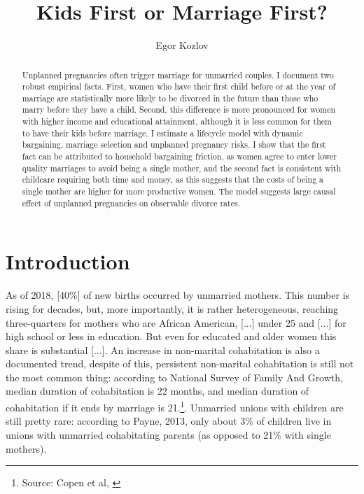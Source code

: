 \documentclass[12pt,letter]{article}
\title{Kids First or Marriage First?}
\author{Egor Kozlov}
\begin{document}
\maketitle



\begin{abstract}
Unplanned pregnancies often trigger marriage for unmarried couples. I document two robust empirical facts. First, women who have their first child before or at the year of marriage are statistically more likely to be divorced in the future than those who marry before they have a child. Second, this difference is more pronounced for women with higher income and educational attainment, although it is less common for them to have their kids before marriage. I estimate a lifecycle model with dynamic bargaining, marriage selection and unplanned pregnancy risks. I show that the first fact can be attributed to household bargaining friction, as women agree to enter lower quality marriages to avoid being a single mother, and  the second fact is consistent with childcare requiring both time and money, as this suggests that the costs of being a single mother are higher for more productive women. The model suggests large causal effect of unplanned pregnancies on observable divorce rates. 
\end{abstract}

\section{Introduction}
As of 2018, [40\%] of new births occurred by unmarried mothers. This number is rising for decades, but, more importantly, it is rather heterogeneous, reaching three-quarters for mothers who are African American, [...] under 25 and [...] for high school or less in education. But even for educated and older women this share is substantial [...]. An increase in non-marital cohabitation is also a documented trend, despite of this, persistent non-marital cohabitation is still not the most common thing: according to National Survey of Family And Growth, median duration of cohabitation is 22 months, and median duration of cohabitation if it ends by marriage is 21.\footnote{Source: Copen et al, \cite{copen}}. Unmarried unions with children are still pretty rare: according to Payne, 2013\nocite{payne}, only about 3\% of children live in unions with unmarried cohabitating parents (as opposed to 21\% with single mothers). 
\end{document}
